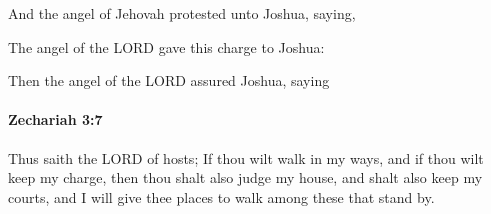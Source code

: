 			\begin{versebox}
					\item[BHS] 
					\item[LXX] 
					\item[ASV] And the angel of Jehovah protested unto Joshua, saying,
					\item[NIV] The angel of the LORD gave this charge to Joshua:
					\item[NRSV] Then the angel of the LORD assured Joshua, saying
			\end{versebox}

		\paragraph{Zechariah 3:7} %
			\label{ZECHARIAH-3-7}

			Thus saith the LORD of hosts; If thou wilt walk in my ways, and if thou wilt keep my charge, then thou shalt also judge my house, and shalt also keep my courts, and I will give thee places to walk among these that stand by.

